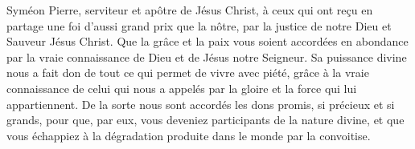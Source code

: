 Syméon Pierre, serviteur et apôtre de Jésus Christ,
	à ceux qui ont reçu en partage une foi d’aussi grand prix que la nôtre,
	par la justice de notre Dieu et Sauveur Jésus Christ.
Que la grâce et la paix vous soient accordées en abondance
	par la vraie connaissance de Dieu et de Jésus notre Seigneur.
Sa puissance divine nous a fait don de tout ce qui permet de vivre avec piété,
	grâce à la vraie connaissance de celui qui nous a appelés
	par la gloire et la force qui lui appartiennent.
De la sorte nous sont accordés les dons promis, si précieux et si grands,
	pour que, par eux, vous deveniez participants de la nature divine,
	et que vous échappiez à la dégradation
		produite dans le monde par la convoitise.
